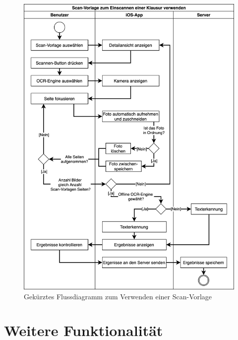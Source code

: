 \documentclass[notables, nomenclature, oneside, 150]{HSMW-Thesis}
\begin{document}
   	\begin{figure}[th]
   		\centering
   		\includegraphics[width=\textwidth,height=\textheight,keepaspectratio]{img/verwenden_flow}
   		\caption{Gekürztes Flussdiagramm zum Verwenden einer Scan-Vorlage}
   		\label{fig:verwenden_flow}
   	\end{figure}

	
\chapter{Weitere Funktionalität} \label{ch:accses}
\end{document}
